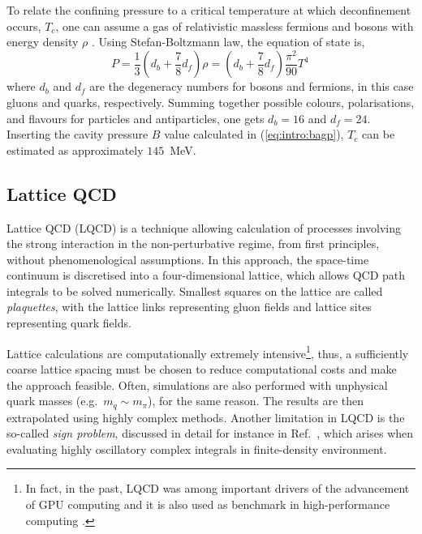 To relate the confining pressure to a critical temperature at which deconfinement occurs, $T_c$, one can assume a gas of relativistic massless fermions and bosons with energy density $\rho$ \cite{wongIntroductionHighEnergyHeavyIon1994, mcgreevyLectureNotesQuantum}. Using Stefan-Boltzmann law, the equation of state is,
\begin{equation}
P = \frac{1}{3} ( d_b + \frac{7}{8} d_f ) \rho = ( d_b + \frac{7}{8} d_f ) \frac{\pi^2}{90} T^4 \,
\end{equation}
where $d_b$ and $d_f$ are the degeneracy numbers for bosons and fermions, in this case gluons and quarks, respectively. Summing together possible colours, polarisations, and flavours for particles and antiparticles, one gets $d_b = 16$ and $d_f = 24$. Inserting the cavity pressure $B$ value calculated in (\ref{eq:intro:bagp}), $T_c$ can be estimated as approximately $145$~MeV.

\subsection{Lattice QCD}

Lattice QCD (LQCD) is a technique allowing calculation of processes involving the strong interaction in the non-perturbative regime, from first principles, without phenomenological assumptions. In this approach, the space-time continuum is discretised into a four-dimensional lattice, which allows QCD path integrals to be solved numerically. Smallest squares on the lattice are called \textit{plaquettes}, with the lattice links representing gluon fields and lattice sites representing quark fields. \cite{meyerLatticeQCDBrief2015}

Lattice calculations are computationally extremely intensive\footnote{In fact, in the past, LQCD was among important drivers of the advancement of GPU computing and it is also used as benchmark in high-performance computing \cite{bennettBSMBenchFlexibleScalable2016}.}, thus, a sufficiently coarse lattice spacing must be chosen to reduce computational costs and make the approach feasible. Often, simulations are also performed with unphysical quark masses (e.g.\ $m_q \sim m_\pi$), for the same reason. The results are then extrapolated using highly complex methods. Another limitation in LQCD is the so-called \textit{sign problem}, discussed in detail for instance in Ref.~\cite{nagataFinitedensityLatticeQCD2022}, which arises when evaluating highly oscillatory complex integrals in finite-density environment.

